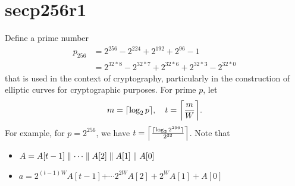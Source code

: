 \section{secp256r1}
Define a prime number \begin{align*}
p_{256} &= 2^{256}-2^{224}+2^{192}+2^{96}-1 \\
&=2^{32*8}-2^{32*7}+2^{32*6}+2^{32*3}-2^{32*0}
\end{align*} that is used in the context of cryptography, particularly in the construction of elliptic curves for cryptographic purposes.
For prime $p$, let \begin{align*}
	m = \ceil*{\log_2 p},\quad t=\ceil*{\frac{m}{W}}.
\end{align*} For example, for $p=2^{256}$, we have $t=\ceil*{\frac{\ceil{\log_2 2^{256}}}{2^{32}}}$. Note that \begin{itemize}
\item $A = A[t-1]\adjacent\cdots\adjacent A[2]\adjacent A[1]\adjacent A[0]$
\item $a = 2^{(t-1)W}A[t-1]$+$\cdots 2^{2W}A[2]+2^{W}A[1]+A[0]$
\end{itemize}

